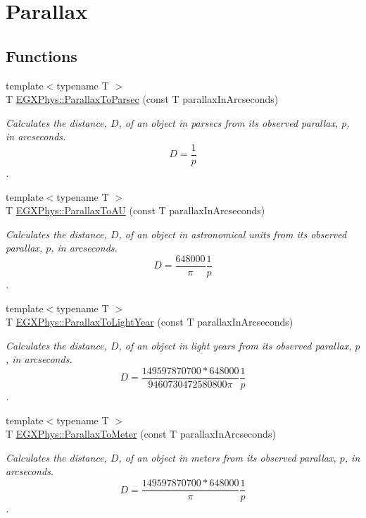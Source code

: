 \hypertarget{group___e_g_x_phys-_astrophysic-_parallax}{}\section{Parallax}
\label{group___e_g_x_phys-_astrophysic-_parallax}
\subsection*{Functions}
\begin{DoxyCompactItemize}
\item 
{\footnotesize template$<$typename T $>$ }\\T \mbox{\hyperlink{group___e_g_x_phys-_astrophysic-_parallax_gab42dbec142e1a47925fc45e899845861}{E\+G\+X\+Phys\+::\+Parallax\+To\+Parsec}} (const T parallax\+In\+Arcseconds)
\begin{DoxyCompactList}\small\item\em Calculates the distance, $D$, of an object in parsecs from its observed parallax, $p$, in arcseconds. \[ D=\dfrac{1}{p}\]. \end{DoxyCompactList}\item 
{\footnotesize template$<$typename T $>$ }\\T \mbox{\hyperlink{group___e_g_x_phys-_astrophysic-_parallax_ga2085f91170baba79a7fcc8a0ba77d1eb}{E\+G\+X\+Phys\+::\+Parallax\+To\+AU}} (const T parallax\+In\+Arcseconds)
\begin{DoxyCompactList}\small\item\em Calculates the distance, $D$, of an object in astronomical units from its observed parallax, $p$, in arcseconds. \[ D=\dfrac{648000}{\pi}\dfrac{1}{p}\]. \end{DoxyCompactList}\item 
{\footnotesize template$<$typename T $>$ }\\T \mbox{\hyperlink{group___e_g_x_phys-_astrophysic-_parallax_gacaec31498f264e2a1dc285062a394de2}{E\+G\+X\+Phys\+::\+Parallax\+To\+Light\+Year}} (const T parallax\+In\+Arcseconds)
\begin{DoxyCompactList}\small\item\em Calculates the distance, $D$, of an object in light years from its observed parallax, $p$, in arcseconds. \[ D=\dfrac{149597870700 * 648000}{9460730472580800 \pi} \dfrac{1}{p}\]. \end{DoxyCompactList}\item 
{\footnotesize template$<$typename T $>$ }\\T \mbox{\hyperlink{group___e_g_x_phys-_astrophysic-_parallax_ga94912bf8b98a04cccab8ef19eaa89b6a}{E\+G\+X\+Phys\+::\+Parallax\+To\+Meter}} (const T parallax\+In\+Arcseconds)
\begin{DoxyCompactList}\small\item\em Calculates the distance, $D$, of an object in meters from its observed parallax, $p$, in arcseconds. \[ D=\dfrac{149597870700 * 648000}{\pi}\dfrac{1}{p}\]. \end{DoxyCompactList}\end{DoxyCompactItemize}


